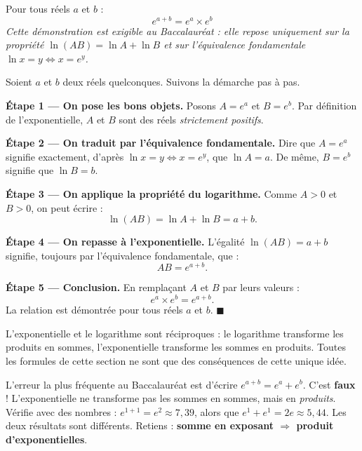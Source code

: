 \documentclass[11pt]{article}
\newcommand{\cle}[1]{{\popxbold\color{popdark}#1}}
\begin{document}
\begin{propriete}
Pour tous réels $a$ et $b$ :
\[
\boxed{\;e^{a+b} = e^a \times e^b\;}
\]
\emph{Cette démonstration est exigible au Baccalauréat : elle repose uniquement sur la propriété $\ln(AB) = \ln A + \ln B$ et sur l'équivalence fondamentale $\ln x = y \iff x = e^y$.}
\end{propriete}

\begin{experience}
Soient $a$ et $b$ deux réels quelconques. Suivons la démarche pas à pas.

\textbf{Étape 1 — On pose les bons objets.} Posons $A = e^a$ et $B = e^b$. Par définition de l'exponentielle, $A$ et $B$ sont des réels \emph{strictement positifs}.

\textbf{Étape 2 — On traduit par l'équivalence fondamentale.} Dire que $A = e^a$ signifie exactement, d'après $\ln x = y \iff x = e^y$, que $\ln A = a$. De même, $B = e^b$ signifie que $\ln B = b$.

\textbf{Étape 3 — On applique la propriété du logarithme.} Comme $A > 0$ et $B > 0$, on peut écrire :
\[
\ln(AB) = \ln A + \ln B = a + b.
\]

\textbf{Étape 4 — On repasse à l'exponentielle.} L'égalité $\ln(AB) = a+b$ signifie, toujours par l'équivalence fondamentale, que :
\[
AB = e^{a+b}.
\]

\textbf{Étape 5 — Conclusion.} En remplaçant $A$ et $B$ par leurs valeurs :
\[
e^a \times e^b = e^{a+b}.
\]
La relation est démontrée pour tous réels $a$ et $b$. \hfill $\blacksquare$
\end{experience}

\begin{aretenir}
L'exponentielle et le logarithme sont réciproques : le logarithme transforme les \cle{produits en sommes}, l'exponentielle transforme les \cle{sommes en produits}. Toutes les formules de cette section ne sont que des conséquences de cette unique idée.
\end{aretenir}

\begin{attention}
L'erreur la plus fréquente au Baccalauréat est d'écrire $e^{a+b} = e^a + e^b$. C'est \textbf{faux} ! L'exponentielle ne transforme pas les sommes en sommes, mais en \emph{produits}. Vérifie avec des nombres : $e^{1+1} = e^2 \approx 7{,}39$, alors que $e^1 + e^1 = 2e \approx 5{,}44$. Les deux résultats sont différents. Retiens : \textbf{somme en exposant $\Rightarrow$ produit d'exponentielles}.
\end{attention}
\end{document}
